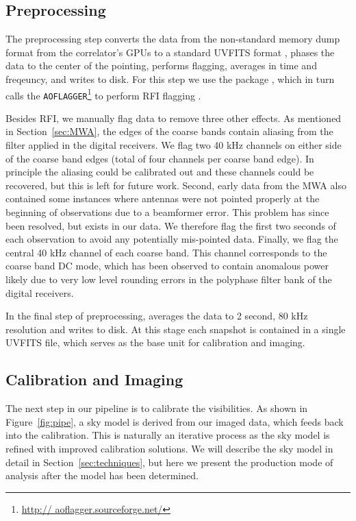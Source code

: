 \documentclass[iop]{emulateapj}
\begin{document}
\subsection{Preprocessing}\label{subsec:preprocessing}
The preprocessing step converts the data from the non-standard memory dump format 
from the correlator's GPUs to a standard UVFITS format \citep{Greisen:2012}, 
phases the data to the center of the pointing,
performs 
flagging, averages in time and freqeuncy, and writes to disk. For this step we use the 
\cotter package \citep{Offringa:2015}, which in turn calls the \texttt{AOFLAGGER}\footnote{\url{http://
aoflagger.sourceforge.net/}} to perform RFI flagging \citep{Offringa:2010}. 

Besides RFI, we manually flag data to remove three other effects. As mentioned in 
Section~\ref{sec:MWA}, the edges of the coarse bands contain aliasing from 
the filter applied in the digital receivers. We flag two 40 kHz channels on either side of the 
coarse band edges (total of four channels per coarse band edge). In principle the aliasing 
could be calibrated out and these channels could be recovered, but this is left for future 
work. Second, early data from the MWA also contained some instances where antennas 
were not pointed properly at the beginning of observations due to a beamformer error. This 
problem has since been resolved, but exists in our data. We therefore flag the first two 
seconds of each observation to avoid any potentially mis-pointed data. 
Finally, we flag the central 40 kHz channel of each coarse band. This channel corresponds
to the coarse band DC mode, which has been observed to contain anomalous power likely
due to very low level rounding errors in the polyphase filter bank of the digital receivers.

In the final step of preprocessing, \cotter averages the data to 2 second, 80 kHz resolution 
and writes to disk. At this stage each snapshot is contained in a single UVFITS file, which 
serves as the base unit for calibration and imaging.


\subsection{Calibration and Imaging}\label{subsec:cal_imaging}
The next step in our pipeline is to calibrate the visibilities. As shown in Figure~\ref{fig:pipe}, 
a sky model is derived from our imaged data, which feeds back into the calibration. This is 
naturally an iterative process as the sky model is refined with improved calibration 
solutions. We will describe the sky model in detail in Section~\ref{sec:techniques}, but here 
we present the production mode of analysis after the model has been determined.
\end{document}
